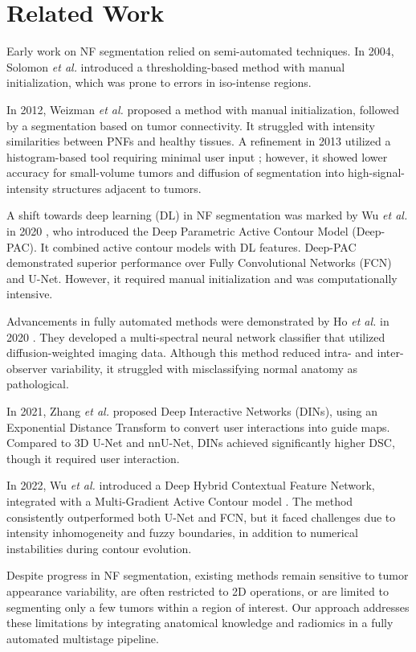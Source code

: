 \section{Related Work}
\label{sec:related work}

Early work on NF segmentation relied on semi-automated techniques. In 2004, Solomon \textit{et al.} \cite{solomon_automated_2004} introduced a thresholding-based method with manual initialization, which was prone to errors in iso-intense regions. 

In 2012, Weizman \textit{et al.} \cite{weizman_interactive_2012} proposed a method with manual initialization, followed by a segmentation based on tumor connectivity. It struggled with intensity similarities between PNFs and healthy tissues. A refinement in 2013 utilized a histogram-based tool requiring minimal user input \cite{weizman_pnist_2014}; however, it showed lower accuracy for small-volume tumors and diffusion of segmentation into high-signal-intensity structures adjacent to tumors.

A shift towards deep learning (DL) in NF segmentation was marked by Wu \textit{et al.} in 2020 \cite{wu_deep_2020}, who introduced the Deep Parametric Active Contour Model (Deep-PAC). It combined active contour models with DL features. Deep-PAC demonstrated superior performance over Fully Convolutional Networks (FCN) and U-Net. However, it required manual initialization and was computationally intensive. 

Advancements in fully automated methods were demonstrated by Ho \textit{et al.} in 2020 \cite{ho_image_2020}. They developed a multi-spectral neural network classifier that utilized diffusion-weighted imaging data. Although this method reduced intra- and inter-observer variability, it struggled with misclassifying normal anatomy as pathological. 

In 2021, Zhang \textit{et al.} \cite{zhang_dins_2022} proposed Deep Interactive Networks (DINs), using an Exponential Distance Transform to convert user interactions into guide maps. Compared to 3D U-Net and nnU-Net, DINs achieved significantly higher DSC, though it required user interaction.

In 2022, Wu \textit{et al.} introduced a Deep Hybrid Contextual Feature Network, integrated with a Multi-Gradient Active Contour model \cite{wu_dh-gac_2022}. The method consistently outperformed both U-Net and FCN, but it faced challenges due to intensity inhomogeneity and fuzzy boundaries, in addition to numerical instabilities during contour evolution. 

Despite progress in NF segmentation, existing methods remain sensitive to tumor appearance variability, are often restricted to 2D operations, or are limited to segmenting only a few tumors within a region of interest. Our approach addresses these limitations by integrating anatomical knowledge and radiomics in a fully automated multistage pipeline.